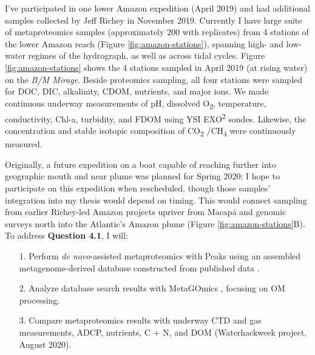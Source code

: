 \documentclass[12pt, letterpaper, twoside]{article}
\begin{document}
I've participated in one lower Amazon expedition (April 2019) and had additional samples collected by Jeff Richey in November 2019. Currently I have large suite of metaproteomics samples (approximately 200 with replicates) from 4 stations of the lower Amazon reach (Figure \ref{fig:amazon-stations}), spanning high- and low- water regimes of the hydrograph, as well as across tidal cycles. Figure \ref{fig:amazon-stations} shows the 4 stations sampled in April 2019 (at rising water) on the \textit{B/M Mirage}. Beside proteomics sampling, all four stations were sampled for DOC, DIC, alkalinity, CDOM, nutrients, and major ions. We made continuous underway measurements of pH, dissolved O\textsubscript{2}, temperature, conductivity, Chl-a, turbidity, and FDOM using YSI EXO\textsuperscript{2} sondes. Likewise, the concentration and stable isotopic composition of CO\textsubscript{2} /CH\textsubscript{4} were continuously measured. 


Originally, a future expedition on a boat capable of reaching further into geographic mouth and near plume was planned for Spring 2020; I hope to participate on this expedition when rescheduled, though those samples' integration into my thesis would depend on timing. This would connect sampling from earlier Richey-led Amazon projects upriver from Macap\'{a} and genomic surveys north into the Atlantic's Amazon plume (Figure \ref{fig:amazon-stations}B). To address \textbf{Question 4.1}, I will:

\begin{enumerate}
	\item[1.] Perform \textit{de novo}-assisted metaproteomics with Peaks using an assembled metagenome-derived database constructed from published data \cite{satinsky_amazon_2014, doherty_bacterial_2017, satinsky_metagenomic_2015, ghai_metagenomics_2011}.
	\item[2.] Analyze database search results with MetaGOmics \cite{riffle_metagomics_2017}, focusing on OM processing.
	\item[3.] Compare metaproteomics results with underway CTD and gas measurements, ADCP, nutrients, C + N, and DOM (Waterhackweek project, August 2020). 
\end{enumerate}  

\bigskip
\end{document}
